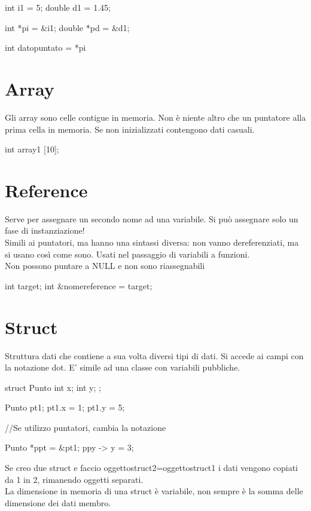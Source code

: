 \begin{cpp}
int i1 = 5;
double d1 = 1.45;

int *pi = &i1;
double *pd = &d1;

int datopuntato = *pi
\end{cpp}

\section{Array}
Gli array sono celle contigue in memoria. Non è niente altro che un puntatore alla prima cella in memoria. Se non inizializzati contengono dati casuali.

\begin{cpp}
int array1 [10];
\end{cpp}

\section{Reference}
Serve per assegnare un secondo nome ad una variabile. Si può assegnare solo un fase di instanziazione!\\
Simili ai puntatori, ma hanno una sintassi diversa: non vanno dereferenziati, ma si usano così come sono. Usati nel passaggio di variabili a funzioni.\\
Non possono puntare a NULL e non sono riassegnabili

\begin{cpp}
int target;
int &nomereference = target;
\end{cpp}

\section{Struct}
Struttura dati che contiene a sua volta diversi tipi di dati. Si accede ai campi con la notazione dot. E' simile ad una classe con variabili pubbliche.

\begin{cpp}
struct Punto {
	int x;
	int y;
};

Punto pt1;
pt1.x = 1;
pt1.y = 5;

//Se utilizzo puntatori, cambia la notazione

Punto *ppt = &pt1;
ppy -> y = 3;
\end{cpp}

Se creo due struct e faccio oggettostruct2=oggettostruct1 i dati vengono copiati da 1 in 2, rimanendo oggetti separati.\\
La dimensione in memoria di una struct è variabile, non sempre è la somma delle dimensione dei dati membro.

